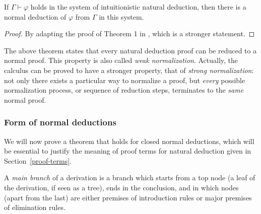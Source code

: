 \begin{theorem}
  If $\Gamma \vdash \varphi$ holds in the system of intuitionistic natural
  deduction, then there is a normal deduction of $\varphi$ from $\Gamma$ in this
  system.
\end{theorem}
\begin{proof}
  By adapting the proof of Theorem 1 in \cite{prawitz1965}, which is a stronger
  statement.
\end{proof}

The above theorem states that every natural deduction proof can be reduced to a
normal proof. This property is also called \emph{weak normalization}. Actually,
the calculus can be proved to have a stronger property, that of \emph{strong
  normalization}: not only there exists a particular way to normalize a proof,
but \emph{every} possible normalization process, or sequence of reduction steps,
terminates to the \emph{same} normal proof.

\subsubsection{Form of normal deductions}

We will now prove a theorem that holds for closed normal deductions, which will
be essential to justify the meaning of proof terms for natural deduction given
in Section~\ref{proof-terms}.

\begin{definition}
  A \emph{main branch} of a derivation is a branch which starts from a top node
  (a leaf of the derivation, if seen as a tree), ends in the conclusion, and in
  which nodes (apart from the last) are either premises of introduction rules or
  major premises of elimination rules.
\end{definition}

